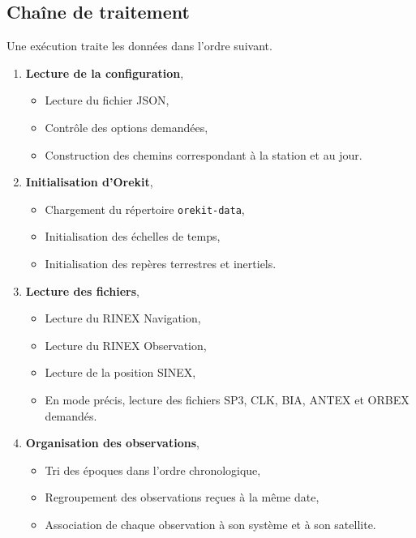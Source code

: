 \subsection{Chaîne de traitement}
\label{sec:implementation_processing_chain}

Une exécution traite les données dans l'ordre suivant.

\begin{enumerate}
    \item \textbf{Lecture de la configuration},
    \begin{itemize}
        \item Lecture du fichier JSON,
        \item Contrôle des options demandées,
        \item Construction des chemins correspondant à la station et au jour.
    \end{itemize}

    \item \textbf{Initialisation d'Orekit},
    \begin{itemize}
        \item Chargement du répertoire \texttt{orekit-data},
        \item Initialisation des échelles de temps,
        \item Initialisation des repères terrestres et inertiels.
    \end{itemize}

    \item \textbf{Lecture des fichiers},
    \begin{itemize}
        \item Lecture du RINEX Navigation,
        \item Lecture du RINEX Observation,
        \item Lecture de la position SINEX,
        \item En mode précis, lecture des fichiers SP3, CLK, BIA, ANTEX et
        ORBEX demandés.
    \end{itemize}

    \item \textbf{Organisation des observations},
    \begin{itemize}
        \item Tri des époques dans l'ordre chronologique,
        \item Regroupement des observations reçues à la même date,
        \item Association de chaque observation à son système et à son
        satellite.
    \end{itemize}


\end{enumerate}

